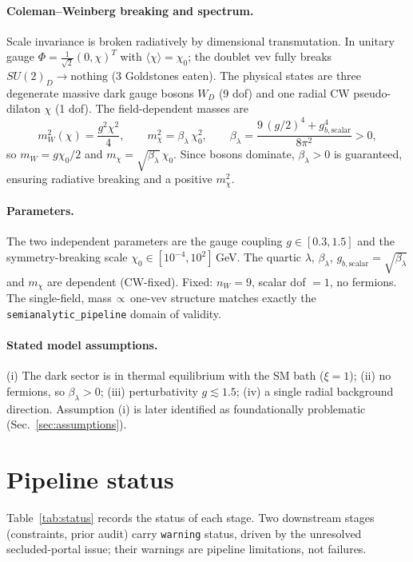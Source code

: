 \documentclass[11pt]{article}
\newcommand{\chizero}{\chi_0}
\begin{document}
\paragraph{Coleman--Weinberg breaking and spectrum.}
Scale invariance is broken radiatively by dimensional transmutation. In unitary gauge
$\Phi=\tfrac{1}{\sqrt2}(0,\chi)^T$ with $\langle\chi\rangle=\chizero$; the doublet vev fully breaks
$SU(2)_D\to\text{nothing}$ (3 Goldstones eaten). The physical states are three degenerate massive dark
gauge bosons $W_D$ (9 dof) and one radial CW pseudo-dilaton $\chi$ (1 dof). The field-dependent masses
are
\begin{equation}
m_W^2(\chi)=\frac{g^2\chi^2}{4},\qquad m_\chi^2 = \beta_\lambda\,\chizero^2,\qquad
\beta_\lambda=\frac{9\,(g/2)^4 + g_{b,\mathrm{scalar}}^4}{8\pi^2}>0 ,
\end{equation}
so $m_W=g\chizero/2$ and $m_\chi=\sqrt{\beta_\lambda}\,\chizero$. Since bosons dominate,
$\beta_\lambda>0$ is guaranteed, ensuring radiative breaking and a positive $m_\chi^2$.

\paragraph{Parameters.} The two independent parameters are the gauge coupling $g\in[0.3,1.5]$ and the
symmetry-breaking scale $\chizero\in[10^{-4},10^2]\,$GeV. The quartic $\lambda$, $\beta_\lambda$,
$g_{b,\mathrm{scalar}}=\sqrt{\beta_\lambda}$ and $m_\chi$ are dependent (CW-fixed). Fixed:
$n_W=9$, scalar dof $=1$, no fermions. The single-field, mass$\,\propto\,$one-vev structure matches
exactly the \texttt{semianalytic\_pipeline} domain of validity.

\paragraph{Stated model assumptions.} (i) The dark sector is in thermal equilibrium with the SM bath
($\xi=1$); (ii) no fermions, so $\beta_\lambda>0$; (iii) perturbativity $g\lesssim1.5$; (iv) a single
radial background direction. Assumption (i) is later identified as foundationally problematic
(Sec.~\ref{sec:assumptions}).

\section{Pipeline status}
\label{sec:status}
Table~\ref{tab:status} records the status of each stage. Two downstream stages (constraints, prior
audit) carry \texttt{warning} status, driven by the unresolved secluded-portal issue; their warnings
are pipeline limitations, not failures.
\end{document}
